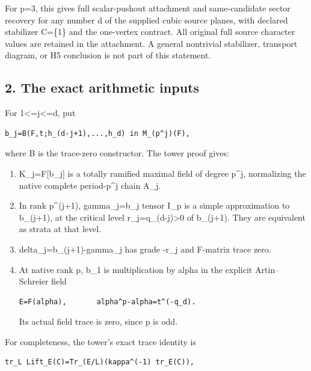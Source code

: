 For p=3, this gives full scalar-pushout attachment and same-candidate
sector recovery for any number d of the supplied cubic source planes,
with declared stabilizer C=\{1\} and the one-vertex contract. All
original full source character values are retained in the attachment. A
general nontrivial stabilizer, transport diagram, or H5 conclusion is
not part of this statement.

\hypertarget{odd_character-the-exact-arithmetic-inputs}{%
\subsection{2. The exact arithmetic
inputs}\label{odd_character-the-exact-arithmetic-inputs}}

For 1\textless=j\textless=d, put

\begin{Verbatim}[fontsize=\small,breaklines=true,breakanywhere=true]
b_j=B(F,t;h_(d-j+1),...,h_d) in M_(p^j)(F),
\end{Verbatim}

where B is the trace-zero constructor. The tower proof gives:

\begin{enumerate}
\def\labelenumi{\arabic{enumi}.}
\item
  K\_j=F{[}b\_j{]} is a totally ramified maximal field of degree p\^{}j,
  normalizing the native complete period-p\^{}j chain A\_j.
\item
  In rank p\^{}(j+1), gamma\_j=b\_j tensor I\_p is a simple
  approximation to b\_(j+1), at the critical level
  r\_j=q\_(d-j)\textgreater0 of b\_(j+1). They are equivalent as strata
  at that level.
\item
  delta\_j=b\_(j+1)-gamma\_j has grade -r\_j and F-matrix trace zero.
\item
  At native rank p, b\_1 is multiplication by alpha in the explicit
  Artin--Schreier field

\begin{Verbatim}[fontsize=\small,breaklines=true,breakanywhere=true]
E=F(alpha),       alpha^p-alpha=t^(-q_d).
\end{Verbatim}

  Its actual field trace is zero, since p is odd.
\end{enumerate}

For completeness, the tower's exact trace identity is

\begin{Verbatim}[fontsize=\small,breaklines=true,breakanywhere=true]
tr_L Lift_E(C)=Tr_(E/L)(kappa^(-1) tr_E(C)),
\end{Verbatim}


